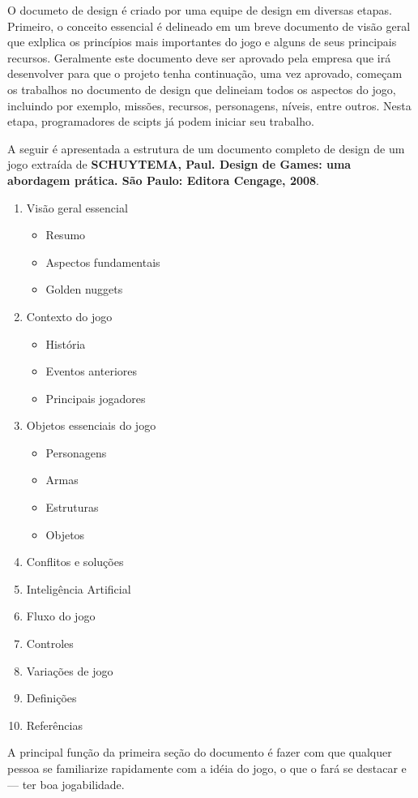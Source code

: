O documeto de design é criado por uma equipe de design em diversas etapas. Primeiro, o conceito essencial é delineado em um breve documento de visão geral que exlplica os princípios mais importantes do jogo e alguns de seus principais recursos.
Geralmente este documento deve ser aprovado pela empresa que irá desenvolver para que o projeto tenha continuação, uma vez aprovado, começam os trabalhos no documento de design que delineiam todos os aspectos do jogo, incluindo por exemplo, missões, recursos, personagens, níveis, entre outros. Nesta etapa, programadores de scipts já podem iniciar seu trabalho.

A seguir é apresentada a estrutura de um documento completo de design de um jogo extraída de \textbf{SCHUYTEMA, Paul. Design de Games: uma abordagem prática. São Paulo: Editora Cengage, 2008}.

\begin{enumerate}
\item Visão geral essencial
\begin{itemize}
\item Resumo
\item Aspectos fundamentais
\item Golden nuggets
\end{itemize}
\item Contexto do jogo
\begin{itemize}
\item História
\item Eventos anteriores
\item Principais jogadores
\end{itemize}
\item Objetos essenciais do jogo
\begin{itemize}
\item Personagens
\item Armas
\item Estruturas
\item Objetos
\end{itemize}
\item Conflitos e soluções
\item Inteligência Artificial
\item Fluxo do jogo
\item Controles
\item Variações de jogo
\item Definições
\item Referências
\end{enumerate}


A principal função da primeira seção do documento é fazer com que qualquer pessoa se familiarize rapidamente com a idéia do jogo, o que o fará se destacar e --- ter boa jogabilidade.
